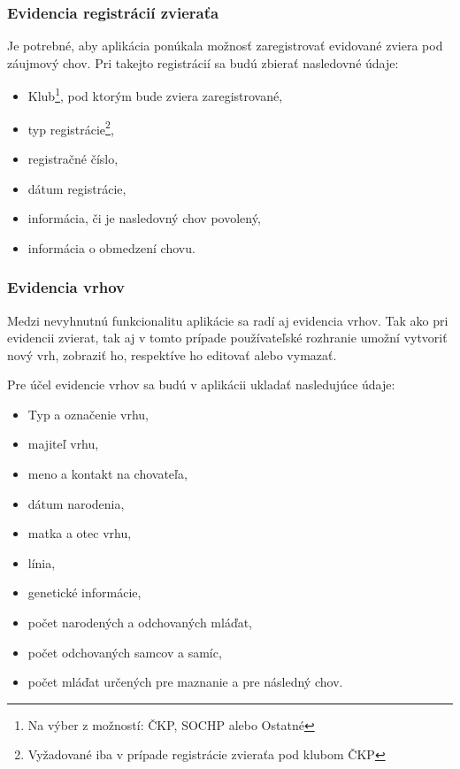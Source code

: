 \subsubsection{Evidencia registrácií zvieraťa}\label{evidencia-registracii-zvierata}
Je potrebné, aby aplikácia ponúkala možnosť zaregistrovať evidované zviera pod záujmový chov.
Pri takejto registrácií sa budú zbierať nasledovné údaje:

\begin{itemize}
	\item Klub\footnote{Na výber z možností: ČKP, SOCHP alebo Ostatné}, pod ktorým bude zviera zaregistrované,
	\item typ registrácie\footnote{Vyžadované iba v prípade registrácie zvieraťa pod klubom ČKP},
	\item registračné číslo,
	\item dátum registrácie,
	\item informácia, či je nasledovný chov povolený,
	\item informácia o obmedzení chovu.
\end{itemize}

\subsubsection{Evidencia vrhov}
Medzi nevyhnutnú funkcionalitu aplikácie sa radí aj evidencia vrhov. Tak ako pri evidencii zvierat, tak aj v tomto prípade používateľské rozhranie umožní vytvoriť nový vrh, zobraziť ho, respektíve ho editovať alebo vymazať. 

\hfill \break
Pre účel evidencie vrhov sa budú v aplikácii ukladať nasledujúce údaje:

\begin{itemize}
	\item Typ a označenie vrhu,
	\item majiteľ vrhu,
	\item meno a kontakt na chovateľa,
	\item dátum narodenia,
	\item matka a otec vrhu,
	\item línia,
	\item genetické informácie,
	\item počet narodených a odchovaných mláďat,
	\item počet odchovaných samcov a samíc,
	\item počet mláďat určených pre maznanie a pre následný chov.
\end{itemize}

